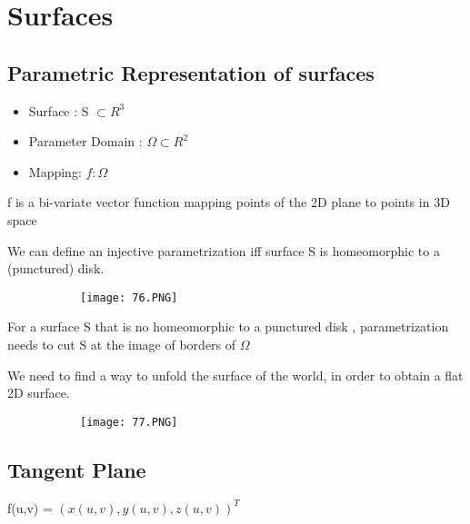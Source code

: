 \documentclass{article}
\begin{document}
\vspace{35mm}

\section{Surfaces}

\subsection{Parametric Representation of surfaces}

\begin{itemize}
    \item Surface : S $\subset R^3$
    \item Parameter Domain : $\Omega \subset R^2$
    \item Mapping: $f: \Omega$ 
\end{itemize}

f is a bi-variate vector function mapping points of the 2D plane to points in 3D space

We can define an injective parametrization iff surface S is homeomorphic to a (punctured) disk.


    \begin{figure}[ht!]
  \centering
  \begin{subfigure}[b]{0.4\linewidth}
    \texttt{[image: 76.PNG]}
  \end{subfigure}
\end{figure}

For a surface S that is no homeomorphic to a punctured disk , parametrization needs to cut S at the image of borders of $\Omega$

We need to find a way to unfold the surface of the world, in order to obtain a flat 2D surface.


    \begin{figure}[ht!]
  \centering
  \begin{subfigure}[b]{0.4\linewidth}
    \texttt{[image: 77.PNG]}
  \end{subfigure}
\end{figure}


\vspace{60mm}

\subsection{Tangent Plane}

f(u,v) = $(x(u,v),y(u,v),z(u,v))^T$
\end{document}
